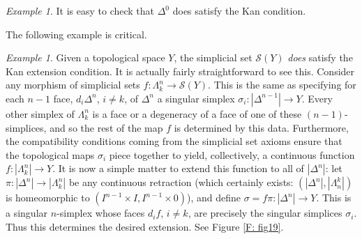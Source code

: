 \documentclass[12pt]{article}
\theoremstyle{plain}
\theoremstyle{definition}
\theoremstyle{remark}
\newtheorem{example}[theorem]{Example}
\newcommand{\ms}[1]{\mathscr{#1}}
\begin{document}
\begin{example}
It is easy to check that $\Delta^0$ does satisfy the Kan condition.
\end{example}

The following example is critical. 

\begin{example}\label{E: simp Kan}
Given a topological space $Y$, the simplicial set $\ms S(Y)$ \emph{does} satisfy the Kan extension condition. It is actually fairly straightforward to see this. Consider any morphism of simplicial sets $f\colon\Lambda^n_k\to \ms S(Y)$. This is the same as specifying for each $n-1$ face, $d_i\Delta^n$, $i\neq k$, of $\Delta^n$ a singular simplex $\sigma_i\colon|\Delta^{n-1}|\to Y$. Every other simplex of $\Lambda^n_k$ is a face or a degeneracy of a face of one of these $(n-1)$-simplices, and so the rest of the map $f$ is determined by this data. Furthermore, the compatibility conditions coming from the simplicial set axioms ensure that the topological maps $\sigma_i$ piece together to yield, collectively, a continuous function $f\colon|\Lambda^n_k|\to Y$. It is now a simple matter to extend this function to all of $|\Delta^n|$: let $\pi\colon|\Delta^n|\to |\Lambda^n_k|$ be any continuous retraction (which certainly exists: $(|\Delta^n|,|\Lambda^k_n|)$ is homeomorphic to $(I^{n-1}\times I,I^{n-1}\times 0)$), and define $\sigma=f \pi\colon|\Delta^n|\to Y$. This is a singular $n$-simplex whose faces $d_if$, $i\neq k$, are precisely the singular simplices $\sigma_i$. Thus this determines the desired extension. See Figure \ref{F: fig19}.
\end{example}
\end{document}
